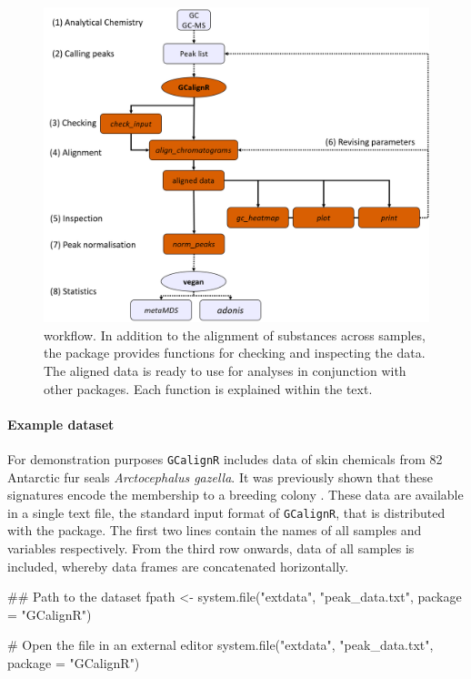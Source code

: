 \begin{figure}[htbp]
  \centering
  \includegraphics[width=13cm]{figures/workflow}
  \caption{ workflow. In addition to the alignment of substances across samples, the package provides functions for checking and inspecting the data. The aligned data is ready to use for analyses in conjunction with other packages. Each function is explained within the text.}
  \label{figure:workflow}
\end{figure}

\paragraph{Example dataset}\label{example-dataset}

For demonstration purposes \texttt{GCalignR} includes data of skin
chemicals from 82 Antarctic fur seals \textit{Arctocephalus gazella}. It
was previously shown that these signatures encode the membership to a
breeding colony \cite{Stoffel.2015}. These data are available in a
single text file, the standard input format of \texttt{GCalignR}, that
is distributed with the package. The first two lines contain the names
of all samples and variables respectively. From the third row onwards,
data of all samples is included, whereby data frames are concatenated
horizontally.

\begin{Schunk}
\begin{Sinput}
## Path to the dataset
fpath <- system.file("extdata", "peak_data.txt", package = "GCalignR")
\end{Sinput}
\end{Schunk}\begin{Schunk}
\begin{Sinput}
# Open the file in an external editor
system.file("extdata", "peak_data.txt", package = "GCalignR")
\end{Sinput}
\end{Schunk}


